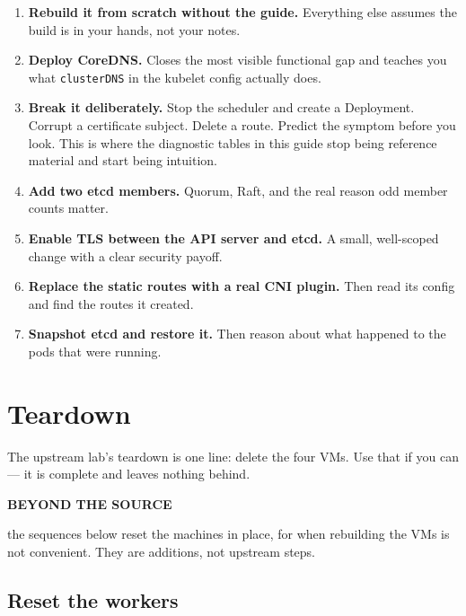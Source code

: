 \documentclass[11pt,oneside]{report}
\providecommand{\tightlist}{%
  \setlength{\itemsep}{0pt}\setlength{\parskip}{0pt}}
\newcommand{\calloutlabel}[2]{{\sffamily\bfseries\footnotesize\color{#1}#2\quad}}
\begin{document}
\begin{enumerate}
\def\labelenumi{\arabic{enumi}.}
\tightlist
\item
  \textbf{Rebuild it
  from scratch
  without the
  guide.} Everything
  else assumes the
  build is in your
  hands, not your
  notes.
\item
  \textbf{Deploy
  CoreDNS.} Closes
  the most visible
  functional gap and
  teaches you what
  \texttt{clusterDNS}
  in the kubelet
  config actually
  does.
\item
  \textbf{Break it
  deliberately.}
  Stop the scheduler
  and create a
  Deployment.
  Corrupt a
  certificate
  subject. Delete a
  route. Predict the
  symptom before you
  look. This is
  where the
  diagnostic tables
  in this guide stop
  being reference
  material and start
  being intuition.
\item
  \textbf{Add two
  etcd members.}
  Quorum, Raft, and
  the real reason
  odd member counts
  matter.
\item
  \textbf{Enable TLS
  between the API
  server and etcd.}
  A small,
  well-scoped change
  with a clear
  security payoff.
\item
  \textbf{Replace
  the static routes
  with a real CNI
  plugin.} Then read
  its config and
  find the routes it
  created.
\item
  \textbf{Snapshot
  etcd and restore
  it.} Then reason
  about what
  happened to the
  pods that were
  running.
\end{enumerate}

\hypertarget{app-teardown}{%
\chapter{Teardown}\label{app-teardown}}

The upstream lab's
teardown is one
line: delete the
four VMs. Use that
if you can --- it is
complete and leaves
nothing behind.

\begin{beyondbox}\calloutlabel{teal}{BEYOND THE SOURCE}

the sequences below
reset the machines
in place, for when
rebuilding the VMs
is not convenient.
They are additions,
not upstream steps.

\end{beyondbox}

\hypertarget{reset-the-workers}{%
\section{Reset the
workers}\label{reset-the-workers}}
\end{document}

